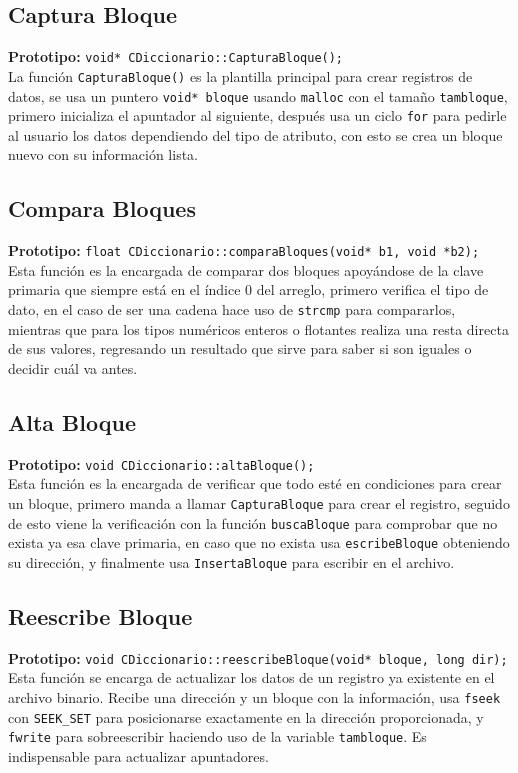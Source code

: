 \documentclass[12pt]{article}
\begin{document}
{}
\subsection*{Captura Bloque}
\textbf{Prototipo:} \verb|void* CDiccionario::CapturaBloque();|\\
La función \verb|CapturaBloque()| es la plantilla principal para 
crear registros de datos, se usa un puntero \verb|void* bloque| 
usando \verb|malloc| con el tamaño \verb|tambloque|, primero 
inicializa el apuntador al siguiente, después usa un ciclo 
\verb|for| para pedirle al usuario los datos dependiendo del 
tipo de atributo, con esto se crea un bloque nuevo con su 
información lista.

{}
\subsection*{Compara Bloques}
\textbf{Prototipo:} \verb|float CDiccionario::comparaBloques(void* b1, void *b2);|\\
Esta función es la encargada de comparar dos bloques apoyándose 
de la clave primaria que siempre está en el índice 0 del 
arreglo, primero verifica el tipo de dato, en el caso de ser 
una cadena hace uso de \verb|strcmp| para compararlos, 
mientras que para los tipos numéricos enteros o flotantes 
realiza una resta directa de sus valores, regresando un 
resultado que sirve para saber si son iguales o decidir cuál va 
antes.

{}
\subsection*{Alta Bloque}
\textbf{Prototipo:} \verb|void CDiccionario::altaBloque();|\\
Esta función es la encargada de verificar que todo esté en 
condiciones para crear un bloque, primero manda a llamar 
\verb|CapturaBloque| para crear el registro, seguido de esto 
viene la verificación con la función \verb|buscaBloque| 
para comprobar que no exista ya esa clave primaria, 
en caso que no exista usa \verb|escribeBloque| 
obteniendo su dirección, y finalmente usa \verb|InsertaBloque| 
para escribir en el archivo.

{}
\subsection*{Reescribe Bloque}
\textbf{Prototipo:} \verb|void CDiccionario::reescribeBloque(void* bloque, long dir);|\\
Esta función se encarga de actualizar los datos de un registro 
ya existente en el archivo binario. Recibe una dirección y un 
bloque con la información, usa \verb|fseek| con \verb|SEEK_SET| 
para posicionarse exactamente en la dirección proporcionada, y 
\verb|fwrite| para sobreescribir haciendo uso de la variable 
\verb|tambloque|. Es indispensable para actualizar apuntadores.
\end{document}
